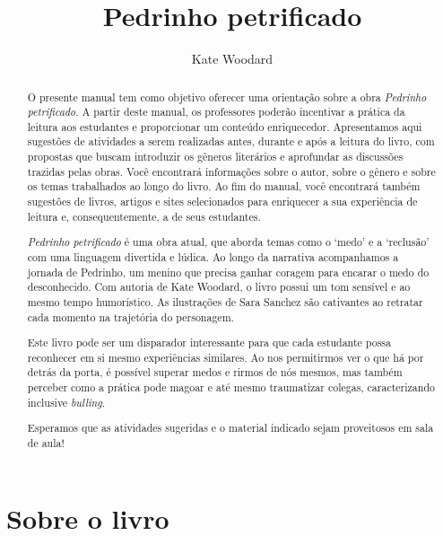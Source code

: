 \documentclass[11pt]{extarticle}
\newcommand{\AutorLivro}{Kate Woodard}
\newcommand{\TituloLivro}{Pedrinho petrificado}
\newcommand{\colaborador}{Ana Lancman}
\begin{document}
\title{\TituloLivro}
\author{\AutorLivro}
\def\authornotes{\colaborador}

\date{}
\maketitle


\tableofcontents

\begin{abstract}
O presente manual tem como objetivo oferecer uma orientação sobre a obra \textit{Pedrinho petrificado}. A partir deste manual, os professores poderão incentivar a prática da leitura aos estudantes e proporcionar um conteúdo enriquecedor. Apresentamos aqui sugestões de atividades a serem realizadas antes, durante e após a leitura do livro, com propostas que buscam introduzir os gêneros literários e aprofundar as discussões trazidas pelas obras. Você encontrará informações sobre o autor, sobre o gênero e sobre os temas trabalhados ao longo do livro. Ao fim do manual, você encontrará também sugestões de livros, artigos e sites selecionados para enriquecer a sua experiência de leitura e, consequentemente, a de seus estudantes.

\textit{Pedrinho petrificado} é uma obra atual, que aborda temas como o `medo' e a `reclusão' com uma linguagem divertida e lúdica. Ao longo da narrativa acompanhamos a jornada de Pedrinho, um menino que precisa ganhar coragem para encarar o medo do desconhecido. Com autoria de Kate Woodard, o livro possui um tom sensível e ao mesmo tempo humorístico. As ilustrações de Sara Sanchez são cativantes ao retratar cada momento na trajetória do personagem. 

Este livro pode ser um disparador interessante para que cada estudante possa reconhecer em si mesmo experiências similares. Ao nos permitirmos ver o que há por detrás da porta, é possível superar medos e rirmos de nós mesmos, mas também perceber como a prática pode magoar e até mesmo traumatizar colegas, caracterizando inclusive \textit{bulling}. 

Esperamos que as atividades sugeridas e o material indicado sejam proveitosos em sala de aula! 

\end{abstract}

\section{Sobre o livro}
\end{document}
